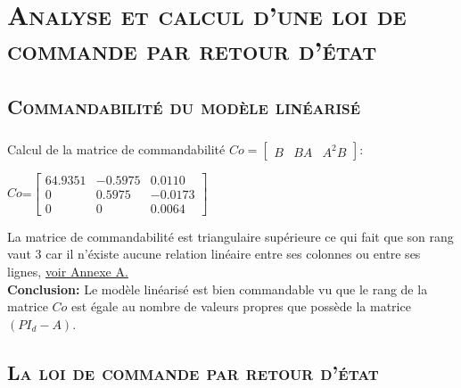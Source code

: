 \chapter{\textsc {Analyse et calcul d'une loi de commande par retour d'état} }
 
	\section{\textsc {Commandabilité du modèle linéarisé}} 
 	
 	\paragraph{}
 		Calcul de la matrice de commandabilité $Co=\begin{bmatrix} B&BA&A^{2}B \end{bmatrix} $:
 		
 		\begin{center}
			
			$Co$=$\begin{bmatrix}
			64.9351&-0.5975&0.0110\\
			0&0.5975&-0.0173\\
			0&0&0.0064
			\end{bmatrix}$	
			 			
		\end{center} 		 
		
		La matrice de commandabilité est triangulaire supérieure ce qui fait que son rang vaut 3 car il n'éxiste aucune relation linéaire entre ses colonnes ou entre ses lignes,\label{Co} \hyperref[Annexe A]{voir Annexe A.}\\
		
		\textbf{Conclusion:} Le modèle linéarisé est bien commandable vu que le rang de la matrice $Co$ est égale au nombre de valeurs propres que possède la matrice $(PI_d-A)$. 
		
		\section{\textsc {La loi de commande par retour d'état}} 
		
		\begin{center}
		\label{fig1}
		\end{center}
		
